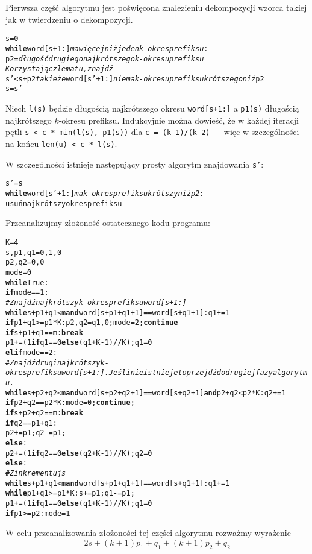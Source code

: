 \documentclass[a4paper]{article}
\begin{document}
Pierwsza część algorytmu jest poświęcona znalezieniu dekompozycji wzorca takiej jak w twierdzeniu o dekompozycji.
\begin{alltt}
s= 0
\textbf{while} word[s+1:] \textit{ma więcej niż jeden k-okres prefiksu}:
  p2= \textit{długość drugiego najkrótszego k-okresu prefiksu}
  \textit{Korzystając z lematu, znajdź}
   s' < s + p2 \textit{takie że} word[s'+1:] \textit{nie ma k-okresu prefiksu krótszego niż} p2
  s= s'
\end{alltt}
Niech \texttt{l(s)} będzie długością najkrótszego okresu \texttt{word[s+1:]} a \texttt{p1(s)} długością najkrótszego \(k\)-okresu prefiksu. Indukcyjnie można dowieść, że w każdej iteracji pętli \texttt{s < c * min(l(s), p1(s))} dla \texttt{c = (k-1)/(k-2)} — więc w szczególności na końcu \texttt{len(u) < c * l(s)}.

W szczególności istnieje następujący prosty algorytm znajdowania \texttt{s'}:
\begin{alltt}
s'= s
\textbf{while} word[s'+1:] \textit{ma k-okres prefiksu krótszy niż p2}:
  usuń najkrótszy okres prefiksu
\end{alltt}
Przeanalizujmy złożoność ostatecznego kodu programu:
\begin{alltt}
K= 4
s,p1,q1= 0,1,0
p2,q2= 0,0
mode=0
\textbf{while} True:
  \textbf{if} mode==1:
    \textit{#Znajdź najkrótszy k-okres prefiksu word[s+1:]}
    \textbf{while} s+p1+q1 < m \textbf{and} word[s+p1+q1+1] == word[s+q1+1]: q1+= 1
    \textbf{if} p1+q1 >= p1*K: p2, q2= q1,0; mode=2; \textbf{continue}
    \textbf{if} s+p1+q1 == m: \textbf{break}
    p1+= (1 \textbf{if} q1==0 \textbf{else} (q1+K-1)//K); q1= 0
  \textbf{elif} mode==2:
    \textit{#Znajdź drugi najkrótszy k-okres prefiksu word[s+1:]. Jeśli nie istnieje to przejdź do drugiej fazy algorytmu.}
    \textbf{while} s+p2+q2 < m \textbf{and} word[s+p2+q2+1] == word[s+q2+1] \textbf{and} p2+q2 < p2*K: q2+= 1
    \textbf{if} p2+q2 == p2*K: mode= 0; \textbf{continue};
    \textbf{if} s+p2+q2 == m: \textbf{break}
    \textbf{if} q2 == p1+q1:
      p2+= p1; q2-= p1;
    \textbf{else}:
      p2+= (1 \textbf{if} q2==0 \textbf{else} (q2+K-1)//K); q2= 0
  \textbf{else}:
    \textit{#Zinkrementuj s}
    \textbf{while} s+p1+q1 < m \textbf{and} word[s+p1+q1+1] == word[s+q1+1]: q1+= 1
    \textbf{while} p1+q1 >= p1*K: s+= p1; q1-= p1;
    p1+= (1 \textbf{if} q1==0 \textbf{else} (q1+K-1)//K); q1= 0
    \textbf{if} p1 >= p2: mode= 1
\end{alltt}
W celu przeanalizowania złożoności tej części algorytmu rozważmy wyrażenie
\[
2s+{\left(k+1\right)}p_1+q_1+{\left(k+1\right)}p_2+q_2
\]
\end{document}
